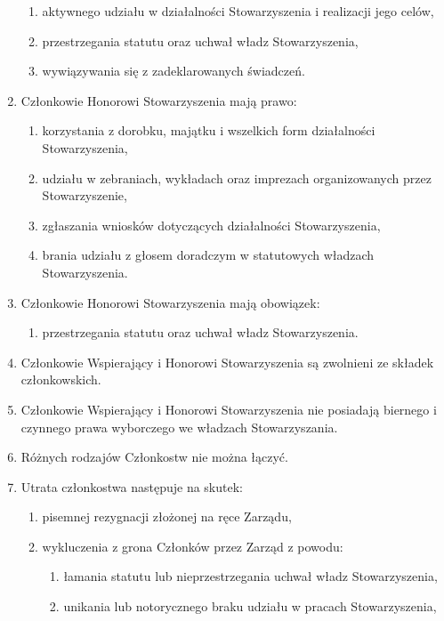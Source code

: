 \documentclass{article}
\begin{document}
\begin{enumerate}
      \begin{enumerate}
        \item aktywnego udziału w działalności Stowarzyszenia i realizacji jego celów,
        \item przestrzegania statutu oraz uchwał władz Stowarzyszenia,
        \item wywiązywania się z zadeklarowanych świadczeń.
      \end{enumerate}
    \item Członkowie Honorowi Stowarzyszenia mają prawo:
      \begin{enumerate}
        \item korzystania z dorobku, majątku i wszelkich form działalności Stowarzyszenia,
        \item udziału w zebraniach, wykładach oraz imprezach organizowanych przez Stowarzyszenie,
        \item zgłaszania wniosków dotyczących działalności Stowarzyszenia,
        \item brania udziału z głosem doradczym w statutowych władzach Stowarzyszenia.
      \end{enumerate}
    \item Członkowie Honorowi Stowarzyszenia mają obowiązek:
      \begin{enumerate}
        \item przestrzegania statutu oraz uchwał władz Stowarzyszenia.
      \end{enumerate}
    \item Członkowie Wspierający i Honorowi Stowarzyszenia są zwolnieni ze składek członkowskich.
    \item Członkowie Wspierający i Honorowi Stowarzyszenia nie posiadają biernego i czynnego prawa wyborczego we władzach Stowarzyszania.
    \item Różnych rodzajów Członkostw nie można łączyć.
    \item Utrata członkostwa następuje na skutek:
      \begin{enumerate}
        \item pisemnej rezygnacji złożonej na ręce Zarządu,
        \item wykluczenia z grona Członków przez Zarząd z powodu:
          \begin{enumerate}
            \item łamania statutu lub nieprzestrzegania uchwał władz Stowarzyszenia,
            \item unikania lub notorycznego braku udziału w pracach Stowarzyszenia,

\end{enumerate}
\end{enumerate}
\end{enumerate}
\end{document}
